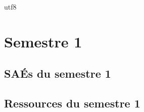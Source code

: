utf8\documentclass[10pt,french]{article} %
\begin{document}
%
%

%
%


%
\section{Semestre 1}
\def\sem{A}

\subsection{SAÉs du semestre 1}
%
\subsection{Ressources du semestre 1}
%
%
%
%
%
%
\newpage

\end{document}
